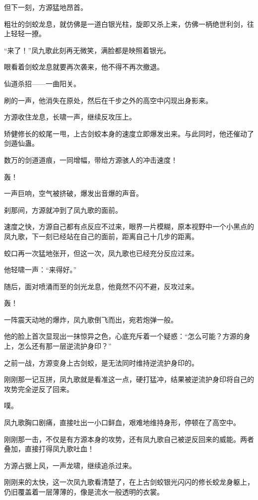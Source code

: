\begin{this_body}
但下一刻，方源猛地昂首。

粗壮的剑蛟龙息，就仿佛是一道白银光柱，旋即又杀上来，仿佛一柄绝世利剑，往上轻轻一撩。

“来了！”凤九歌此刻再无微笑，满脸都是映照着银光。

眼看着剑蛟龙息就要再次袭来，他不得不再次撤退。

仙道杀招——一曲阳关。

刷的一声，他消失在原处，然后在千步之外的高空中闪现出身影来。

方源收住龙息，长啸一声，继续反攻压上。

矫健修长的蛟尾一甩，上古剑蛟本身的速度立即爆发出来。与此同时，他还催动了剑遁仙蛊。

数万的剑道道痕，一同增幅，带给方源骇人的冲击速度！

轰！

一声巨响，空气被挤破，爆发出音爆的声音。

刹那间，方源就冲到了凤九歌的面前。

速度之快，方源自己都有点反应不过来，眼界一片模糊，原本视野中一个小黑点的凤九歌，下一刻已经站在自己的面前，距离自己十几步的距离。

蛟口再一次猛地张开，但这一次，凤九歌也已经充分反应过来。

他轻啸一声：“来得好。”

随后，面对喷涌而至的剑光龙息，他竟然不闪不避，反攻过来。

轰！

一阵震天动地的爆炸，凤九歌倒飞而出，宛若炮弹一般。

他的脸上首次显现出一抹惊异之色，心底充斥着一个疑惑：“怎么可能？方源的身上，怎么还有那一层逆流护身印？”

之前一战，方源变身上古剑蛟，是无法同时维持逆流护身印的。

刚刚那一记互拼，凤九歌就是看准这一点，硬打猛冲，结果被逆流护身印将自己的攻势完全逆反了回来。

噗。

凤九歌胸口剧痛，直接吐出一小口鲜血，艰难地维持身形，停顿在了高空中。

刚刚那一击，不仅是有方源本身的攻势，还有凤九歌自己被逆反回来的威能。两者叠加，直接打得凤九歌吐血！

方源占据上风，一声龙啸，继续追杀过来。

刚刚来的太快，这一次凤九歌看清楚了，在上古剑蛟银光闪闪的修长蛟龙身躯上，仍旧覆盖着一层薄薄的，像是流水一般透明的衣裳。


\end{this_body}
